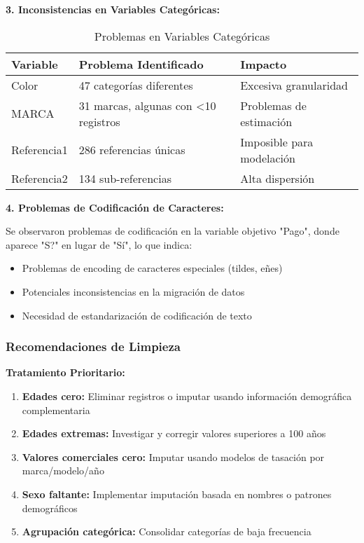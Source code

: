 \textbf{3. Inconsistencias en Variables Categóricas:}

\begin{table}[H]
\centering
\caption{Problemas en Variables Categóricas}
\begin{tabular}{|l|l|l|}
\hline
\textbf{Variable} & \textbf{Problema Identificado} & \textbf{Impacto} \\
\hline
Color & 47 categorías diferentes & Excesiva granularidad \\
MARCA & 31 marcas, algunas con <10 registros & Problemas de estimación \\
Referencia1 & 286 referencias únicas & Imposible para modelación \\
Referencia2 & 134 sub-referencias & Alta dispersión \\
\hline
\end{tabular}
\end{table}

\textbf{4. Problemas de Codificación de Caracteres:}

Se observaron problemas de codificación en la variable objetivo "Pago", donde aparece "S?" en lugar de "Sí", lo que indica:
\begin{itemize}
\item Problemas de encoding de caracteres especiales (tildes, eñes)
\item Potenciales inconsistencias en la migración de datos
\item Necesidad de estandarización de codificación de texto
\end{itemize}

\subsubsection{Recomendaciones de Limpieza}

\textbf{Tratamiento Prioritario:}
\begin{enumerate}
\item \textbf{Edades cero:} Eliminar registros o imputar usando información demográfica complementaria
\item \textbf{Edades extremas:} Investigar y corregir valores superiores a 100 años
\item \textbf{Valores comerciales cero:} Imputar usando modelos de tasación por marca/modelo/año
\item \textbf{Sexo faltante:} Implementar imputación basada en nombres o patrones demográficos
\item \textbf{Agrupación categórica:} Consolidar categorías de baja frecuencia
\end{enumerate}

